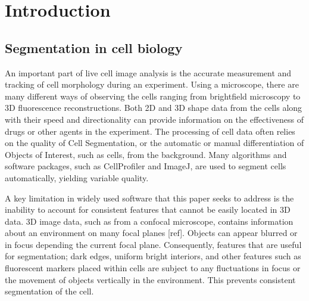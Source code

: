 
\chapter{Introduction}  %

\ifpdf
    \graphicspath{{Chapter1/Figs/Raster/}{Chapter1/Figs/PDF/}{Chapter1/Figs/}}
\else
    \graphicspath{{Chapter1/Figs/Vector/}{Chapter1/Figs/}}
\fi


\section{Segmentation in cell biology}

An important part of live cell image analysis is the accurate measurement and tracking of cell morphology during an experiment. Using a microscope, there are many different ways of observing the cells ranging from brightfield microscopy to 3D fluorescence reconstructions. Both 2D and 3D shape data from the cells along with their speed and directionality can provide information on the effectiveness of drugs or other agents in the experiment. The processing of cell data often relies on the quality of Cell Segmentation, or the automatic or manual differentiation of Objects of Interest, such as cells, from the background. Many algorithms and software packages, such as CellProfiler and ImageJ, are used to segment cells automatically, yielding variable quality.

A key limitation in widely used software that this paper seeks to address is the inability to account for consistent features that cannot be easily located in 3D data. 3D image data, such as from a confocal microscope, contains information about an environment on many focal planes [ref]. Objects can appear blurred or in focus depending the current focal plane. Consequently, features that are useful for segmentation; dark edges, uniform bright interiors, and other features such as fluorescent markers placed within cells are subject to any fluctuations in focus or the movement of objects vertically in the environment. This prevents consistent segmentation of the cell.

